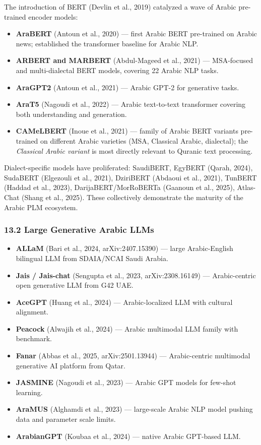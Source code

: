 \documentclass[12pt,a4paper]{article}
\providecommand{\tightlist}{\setlength{\itemsep}{0pt}\setlength{\parskip}{0pt}}
\begin{document}
The introduction of BERT (Devlin et al., 2019) catalyzed a wave of
Arabic pre-trained encoder models:

\begin{itemize}
\tightlist
\item
  \textbf{AraBERT} (Antoun et al., 2020) --- first Arabic BERT
  pre-trained on Arabic news; established the transformer baseline for
  Arabic NLP.
\item
  \textbf{ARBERT and MARBERT} (Abdul-Mageed et al., 2021) ---
  MSA-focused and multi-dialectal BERT models, covering 22 Arabic NLP
  tasks.
\item
  \textbf{AraGPT2} (Antoun et al., 2021) --- Arabic GPT-2 for generative
  tasks.
\item
  \textbf{AraT5} (Nagoudi et al., 2022) --- Arabic text-to-text
  transformer covering both understanding and generation.
\item
  \textbf{CAMeLBERT} (Inoue et al., 2021) --- family of Arabic BERT
  variants pre-trained on different Arabic varieties (MSA, Classical
  Arabic, dialectal); the \emph{Classical Arabic variant} is most
  directly relevant to Quranic text processing.
\end{itemize}

Dialect-specific models have proliferated: SaudiBERT, EgyBERT (Qarah,
2024), SudaBERT (Elgezouli et al., 2021), DziriBERT (Abdaoui et al.,
2021), TunBERT (Haddad et al., 2023), DarijaBERT/MorRoBERTa (Gaanoun et
al., 2025), Atlas-Chat (Shang et al., 2025). These collectively
demonstrate the maturity of the Arabic PLM ecosystem.

\subsubsection{13.2 Large Generative Arabic LLMs}\label{s13-2}

\begin{itemize}
\tightlist
\item
  \textbf{ALLaM} (Bari et al., 2024, arXiv:2407.15390) --- large
  Arabic-English bilingual LLM from SDAIA/NCAI Saudi Arabia.
\item
  \textbf{Jais / Jais-chat} (Sengupta et al., 2023, arXiv:2308.16149)
  --- Arabic-centric open generative LLM from G42 UAE.
\item
  \textbf{AceGPT} (Huang et al., 2024) --- Arabic-localized LLM with
  cultural alignment.
\item
  \textbf{Peacock} (Alwajih et al., 2024) --- Arabic multimodal LLM
  family with benchmark.
\item
  \textbf{Fanar} (Abbas et al., 2025, arXiv:2501.13944) ---
  Arabic-centric multimodal generative AI platform from Qatar.
\item
  \textbf{JASMINE} (Nagoudi et al., 2023) --- Arabic GPT models for
  few-shot learning.
\item
  \textbf{AraMUS} (Alghamdi et al., 2023) --- large-scale Arabic NLP
  model pushing data and parameter scale limits.
\item
  \textbf{ArabianGPT} (Koubaa et al., 2024) --- native Arabic GPT-based
  LLM.
\end{itemize}
\end{document}
